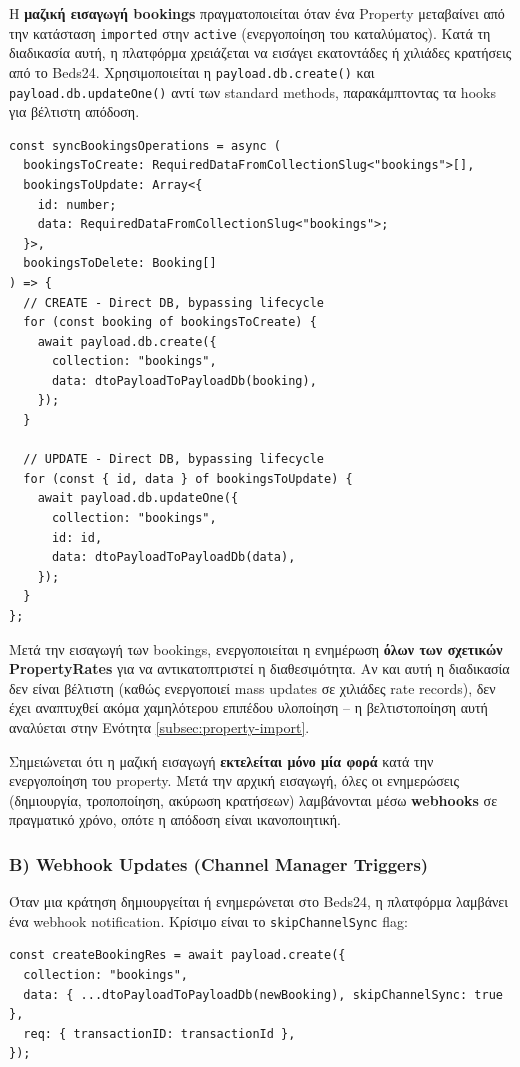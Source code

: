 \documentclass[
	12pt, %
	oneside, %
	greek,
	onehalfspacing, %
	liststotoc, %
	toctotoc, %
	parskip, %
	headsepline, %
]{MastersDoctoralThesis} %
\newcommand{\code}[1]{\texttt{#1}}
\begin{document}
Η \textbf{μαζική εισαγωγή bookings} πραγματοποιείται όταν ένα Property μεταβαίνει από την κατάσταση \code{imported} στην \code{active} (ενεργοποίηση του καταλύματος). Κατά τη διαδικασία αυτή, η πλατφόρμα χρειάζεται να εισάγει εκατοντάδες ή χιλιάδες κρατήσεις από το Beds24. Χρησιμοποιείται η \code{payload.db.create()} και \code{payload.db.updateOne()} αντί των standard methods, παρακάμπτοντας τα hooks για βέλτιστη απόδοση.

\begin{lstlisting}[caption={Mass import με direct DB operations}]
const syncBookingsOperations = async (
  bookingsToCreate: RequiredDataFromCollectionSlug<"bookings">[],
  bookingsToUpdate: Array<{
    id: number;
    data: RequiredDataFromCollectionSlug<"bookings">;
  }>,
  bookingsToDelete: Booking[]
) => {
  // CREATE - Direct DB, bypassing lifecycle
  for (const booking of bookingsToCreate) {
    await payload.db.create({
      collection: "bookings",
      data: dtoPayloadToPayloadDb(booking),
    });
  }

  // UPDATE - Direct DB, bypassing lifecycle
  for (const { id, data } of bookingsToUpdate) {
    await payload.db.updateOne({
      collection: "bookings",
      id: id,
      data: dtoPayloadToPayloadDb(data),
    });
  }
};
\end{lstlisting}

Μετά την εισαγωγή των bookings, ενεργοποιείται η ενημέρωση \textbf{όλων των σχετικών PropertyRates} για να αντικατοπτριστεί η διαθεσιμότητα. Αν και αυτή η διαδικασία δεν είναι βέλτιστη (καθώς ενεργοποιεί mass updates σε χιλιάδες rate records), δεν έχει αναπτυχθεί ακόμα χαμηλότερου επιπέδου υλοποίηση -- η βελτιστοποίηση αυτή αναλύεται στην Ενότητα \ref{subsec:property-import}.

Σημειώνεται ότι η μαζική εισαγωγή \textbf{εκτελείται μόνο μία φορά} κατά την ενεργοποίηση του property. Μετά την αρχική εισαγωγή, όλες οι ενημερώσεις (δημιουργία, τροποποίηση, ακύρωση κρατήσεων) λαμβάνονται μέσω \textbf{webhooks} σε πραγματικό χρόνο, οπότε η απόδοση είναι ικανοποιητική.

\subsubsection{Β) Webhook Updates (Channel Manager Triggers)}

Όταν μια κράτηση δημιουργείται ή ενημερώνεται στο Beds24, η πλατφόρμα λαμβάνει ένα webhook notification. Κρίσιμο είναι το \code{skipChannelSync} flag:

\begin{lstlisting}[caption={Αποτροπή infinite loop με skipChannelSync flag}]
const createBookingRes = await payload.create({
  collection: "bookings",
  data: { ...dtoPayloadToPayloadDb(newBooking), skipChannelSync: true },
  req: { transactionID: transactionId },
});
\end{lstlisting}
\end{document}
